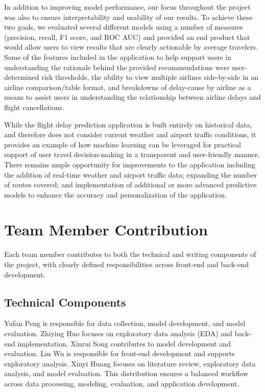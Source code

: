 In addition to improving model performance, our focus throughout the project was also to ensure interpretability and usability of our results. To achieve these two goals, we evaluated several different models using a number of measures (precision, recall, F1 score, and ROC AUC) and provided an end product that would allow users to view results that are clearly actionable by average travelers. Some of the features included in the application to help support users in understanding the rationale behind the provided recommendations were user-determined risk thresholds, the ability to view multiple airlines side-by-side in an airline comparison/table format, and breakdowns of delay-cause by airline as a means to assist users in understanding the relationship between airline delays and flight cancellations.

While the flight delay prediction application is built entirely on historical data, and therefore does not consider current weather and airport traffic conditions, it provides an example of how machine learning can be leveraged for practical support of user travel decision-making in a transparent and user-friendly manner. There remains ample opportunity for improvements to the application including the addition of real-time weather and airport traffic data; expanding the number of routes covered; and implementation of additional or more advanced predictive models to enhance the accuracy and personalization of the application.

\section{Team Member Contribution}

Each team member contributes to both the technical and writing components of the project, with clearly defined responsibilities across front-end and back-end development.

\subsection{Technical Components}

Yufan Peng is responsible for data collection, model development, and model evaluation. Zhiying Huo focuses on exploratory data analysis (EDA) and back-end implementation. Xinrui Song contributes to model development and evaluation. Lin Wu is responsible for front-end development and supports exploratory analysis. Xinyi Huang focuses on literature review, exploratory data analysis, and model evaluation. This distribution ensures a balanced workflow across data processing, modeling, evaluation, and application development.

